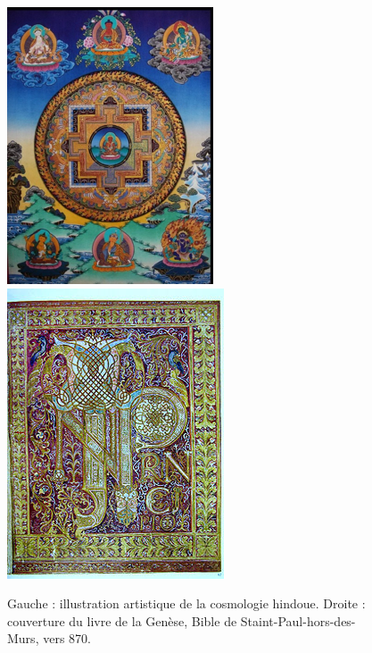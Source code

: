 \documentclass[11pt, twoside, a4paper, openright]{report}
\begin{document}
\begin{figure}
  \centering
  \includegraphics[scale=1]{cosmohindoue.png}
  \hspace{3cm}
  \includegraphics[scale=1]{genese.png}
  \caption{Gauche : illustration artistique de la cosmologie hindoue. Droite : couverture du livre de la Genèse, Bible de Staint-Paul-hors-des-Murs, vers 870.}
  \label{fig:cosmohindoue}
\end{figure}
\end{document}
